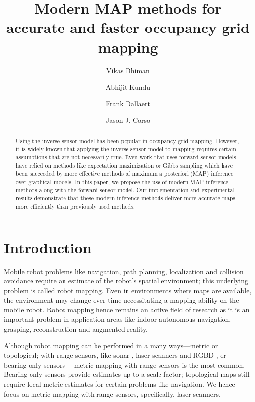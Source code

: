 \documentclass[letterpaper, 10 pt, conference]{ieeeconf} %
\title{\Large \bf
Modern MAP methods for accurate and faster occupancy grid mapping
}
\author[1]{Vikas Dhiman}
\author[2]{Abhijit Kundu}
\author[2]{Frank Dallaert}
\author[1]{Jason J. Corso}
\affil[1]{{\tt\small\{vikasdhi,jcorso\}@buffalo.edu}}
\affil[1]{ Department of Computer Science and Engineering, SUNY at Buffalo, NY, USA }
\affil[2]{{\tt\small\{abhijit.kundu,frank\}@gatech.edu}}
\affil[2]{College of Computing, Georgia Tech, GA, USA}
\begin{document}
\maketitle
\begin{abstract}
Using the inverse sensor model has been popular in occupancy grid mapping. 
However, it is widely known that applying the inverse sensor model to mapping 
requires certain assumptions that are not necessarily true. Even work that uses 
forward sensor models have relied on methods like expectation maximization or 
Gibbs sampling which have been succeeded by more effective methods of maximum a 
posteriori (MAP) inference over graphical models. In this paper, we propose the 
use of modern MAP inference methods along with the forward sensor model.  Our 
implementation and experimental results demonstrate that these modern inference 
methods deliver more accurate maps more efficiently than previously used 
methods.
\end{abstract}
\section{Introduction}

Mobile robot problems like navigation, path planning, localization and collision 
avoidance require an estimate of the robot's spatial environment; this 
underlying problem is called robot mapping\cite{thrun2002robotic}.  Even in 
environments where maps are available, the environment may change over time 
necessitating a mapping ability on the mobile robot.  Robot mapping hence 
remains an active field of research 
\cite{meyer2012occupancy,nagla2012improved,merali2013icra} as it is an important 
problem in application areas like indoor autonomous navigation, grasping, 
reconstruction and augmented reality.

Although robot mapping can be performed in a many ways---metric or topological; 
with range sensors, like sonar \cite{thrun2003learning}, laser scanners 
\cite{thrun2003learning} and RGBD \cite{newcombe2011kinectfusion}, or 
bearing-only sensors \cite{davison2007monoslam,kundu2011realtime}---metric 
mapping with range sensors is the most common.  Bearing-only sensors provide 
estimates up to a scale factor; topological maps still require local metric 
estimates for certain problems like navigation.  We hence focus on metric 
mapping with range sensors, specifically, laser scanners.
\end{document}
